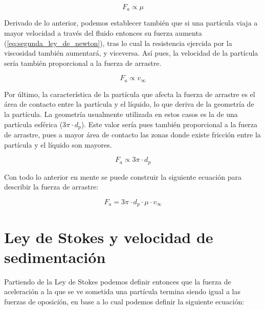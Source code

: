 \documentclass{AsignaturaResumen}
\begin{document}
\begin{equation*}
    F_{a} \propto \mu
\end{equation*}

Derivado de lo anterior, podemos establecer también que si una partícula viaja a mayor velocidad a través del fluido entonces su fuerza aumenta (\autoref{eq:segunda_ley_de_newton}), tras lo cual la resistencia ejercida por la viscosidad también aumentará, y viceversa. Así pues, la velocidad de la partícula sería también proporcional a la fuerza de arrastre.

\begin{equation*}
    F_{a} \propto v_{\infty}
\end{equation*}

Por último, la característica de la partícula que afecta la fuerza de arrastre es el área de contacto entre la partícula y el líquido, lo que deriva de la geometría de la partícula. La geometría usualmente utilizada en estos casos es la de una partícula esférica ($3\pi \cdot d_{p}$). Este valor sería pues también proporcional a la fuerza de arrastre, pues a mayor área de contacto las zonas donde existe fricción entre la partícula y el líquido son mayores.

\begin{equation*}
    F_{a} \propto 3\pi \cdot d_{p}
\end{equation*}

Con todo lo anterior en mente se puede construir la siguiente ecuación para describir la fuerza de arrastre:

\begin{equation}\label{eq:fuerza_de_arrastre}
    F_{a} = 3\pi\cdot d_{p}\cdot\mu\cdot v_{\infty}
\end{equation}



\section{Ley de Stokes y velocidad de sedimentación}


Partiendo de la Ley de Stokes podemos definir entonces que la fuerza de aceleración a la que se ve sometida una partícula termina siendo igual a las fuerzas de oposición, en base a lo cual podemos definir la siguiente ecuación:
\end{document}
